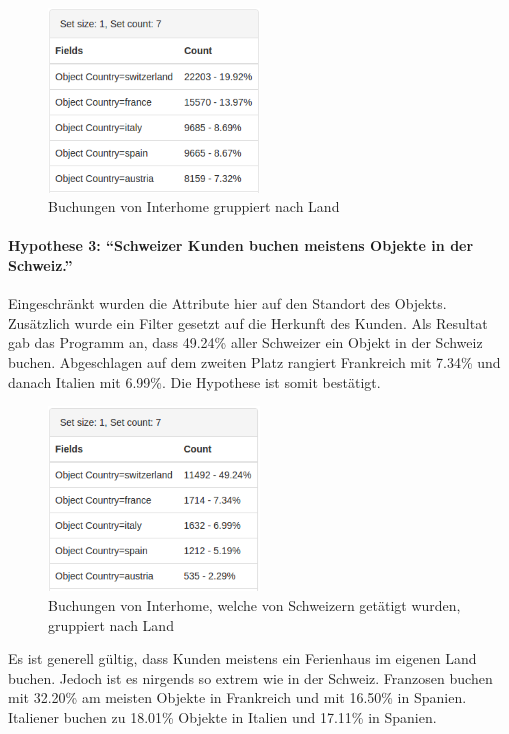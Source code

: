 \begin{figure}[H]
	\RawFloats
	\centering
	\includegraphics[width=0.5\textwidth]{images/hypothese2}
	\caption{Buchungen von Interhome gruppiert nach Land}
	\label{fig:testingfazit:testing:hypothesen:hypothese2}
\end{figure}

\paragraph{Hypothese 3: "`Schweizer Kunden buchen meistens Objekte in der Schweiz."'} Eingeschränkt wurden die Attribute hier auf den Standort des Objekts. Zusätzlich wurde ein Filter gesetzt auf die Herkunft des Kunden. Als Resultat gab das Programm an, dass 49.24\% aller Schweizer ein Objekt in der Schweiz buchen. Abgeschlagen auf dem zweiten Platz rangiert Frankreich mit 7.34\% und danach Italien mit 6.99\%. Die Hypothese ist somit bestätigt.

\begin{figure}[H]
	\RawFloats
	\centering
	\includegraphics[width=0.5\textwidth]{images/hypothese3-1}
	\caption{Buchungen von Interhome, welche von Schweizern getätigt wurden, gruppiert nach Land}
	\label{fig:testingfazit:testing:hypothesen:hypothese3:1}
\end{figure}

Es ist generell gültig, dass Kunden meistens ein Ferienhaus im eigenen Land buchen. Jedoch ist es nirgends so extrem wie in der Schweiz. Franzosen buchen mit 32.20\% am meisten Objekte in Frankreich und mit 16.50\% in Spanien. Italiener buchen zu 18.01\% Objekte in Italien und 17.11\% in Spanien.

